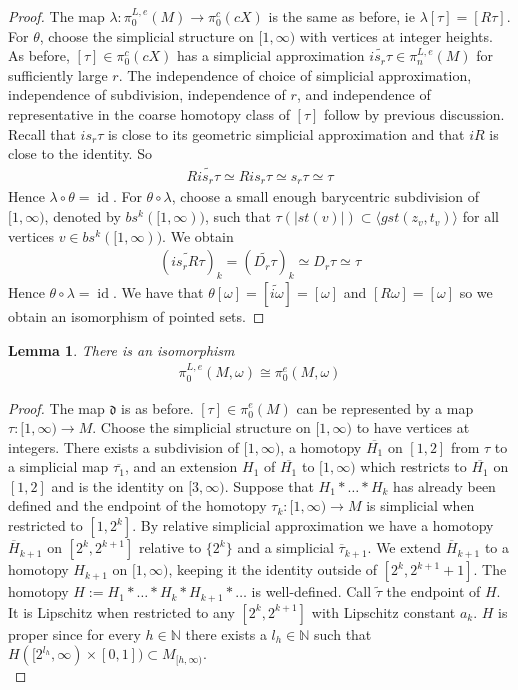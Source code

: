 \documentclass[a4paper,11pt]{article}
\theoremstyle{definition}
\theoremstyle{plain}
\newtheorem{lemma}[definition]{Lemma}
\theoremstyle{remark}
\DeclareMathOperator{\id}{id}
\begin{document}
{\begin{proof} The map $\lambda: \pi_0^{L,e}(M)\rightarrow \pi_0^c(cX)$ is the same as before, ie $\lambda[\tau] = [R\tau]$. For $\theta$, choose the simplicial structure on $[1,\infty)$ with vertices at integer heights. As before, $[\tau]\in \pi_0^c(cX)$ has a simplicial approximation $\widetilde{i s_{r} \tau}\in \pi_n^{L,e}(M)$ for sufficiently large $r$. The independence of choice of simplicial approximation, independence of subdivision, independence of $r$, and independence of representative in the coarse homotopy class of $[\tau]$ follow by previous discussion. Recall that $is_{r}\tau$ is close to its geometric simplicial approximation and that $iR$ is close to the identity. So 
\begin{align*}
R\widetilde{is_{r}\tau} \simeq Ris_{r}\tau \simeq s_{r}\tau \simeq \tau
\end{align*}Hence $\lambda\circ \theta= \id$. For $\theta \circ \lambda$, choose a small enough barycentric subdivision of $[1,\infty)$, denoted by $bs^{k}([1,\infty))$, such that $\tau(|st(v)|)\subset \langle gst(z_v,t_v) \rangle$ for all vertices $v\in bs^{k}([1,\infty))$. We obtain 
\begin{align*}
(\widetilde{is_{r}R \tau})_{k}= (\widetilde{D_{r} \tau})_{k}\simeq D_{r}\tau \simeq \tau
\end{align*}
Hence $\theta\circ \lambda = \id$. We have that $\theta[\omega] = [\widetilde{i\omega}]=[\omega]$ and $[R\omega]=[\omega]$ so we obtain an isomorphism of pointed sets. 
\end{proof}

\begin{lemma} There is an isomorphism 
\begin{align*}
\pi_0^{L,e}(M,\omega)\cong \pi_0^{e}(M,\omega)
\end{align*}
\end{lemma}
\begin{proof} The map $\mathfrak{d}$ is as before. $[\tau]\in \pi_0^{e}(M)$ can be represented by a map $\tau: [1,\infty)\rightarrow M$. Choose the simplicial structure on $[1,\infty)$ to have vertices at integers. There exists a subdivision of $[1,\infty)$, a homotopy $\overline{H_1}$ on $[1,2]$ from $\tau$ to a simplicial map $\overline{\tau_1}$, and an extension $H_1$ of $\overline{H_1}$ to $[1,\infty)$ which restricts to $\overline{H_1}$ on $[1,2]$ and is the identity on $[3,\infty)$. Suppose that $H_1\ast \dots \ast H_{k}$ has already been defined and the endpoint of the homotopy $\tau_k: [1, \infty)\rightarrow M$ is simplicial when restricted to $[1,2^{k}]$. By relative simplicial approximation we have a homotopy $\overline{H}_{k+1}$ on $[2^{k},2^{k+1}]$ relative to $\{2^{k}\}$ and a simplicial $\overline{\tau}_{k+1}$. We extend $\overline{H}_{k+1}$ to a homotopy $H_{k+1}$ on $[1,\infty)$, keeping it the identity outside of $[2^{k},2^{k+1}+1]$. The homotopy $H:=H_1\ast \dots \ast H_{k}\ast H_{k+1}\ast \dots$ is well-defined. Call $\tilde{\tau}$ the endpoint of $H$. It is Lipschitz when restricted to any $[2^{k}, 2^{k+1}]$ with Lipschitz constant $a_{k}$. $H$ is proper since for every $h\in \mathbb{N}$ there exists a $l_h\in \mathbb{N}$ such that $H([2^{l_h},\infty)\times [0,1]) \subset M_{[h,\infty)}$.\\


\end{proof}}
\end{document}
